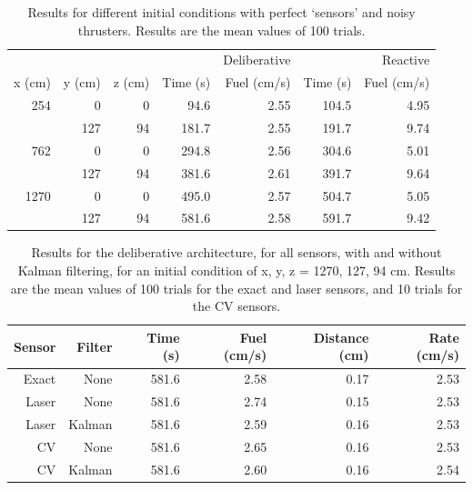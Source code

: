 \documentclass[journal, 10pt]{IEEEtran}
\begin{document}
\begin{table}
\centering
\normalsize
\caption{\label{mean}Results for different initial conditions with perfect `sensors' and noisy thrusters. Results are the mean values of 100 trials.}
\begin{tabular}{r r r | r r | r r}
\toprule
     &     &    &          & Deliberative &           & Reactive \\
   x (cm)& y (cm)& z (cm)& Time (s) & Fuel (cm/s) &  Time (s) & Fuel (cm/s) \\
\midrule
254  & 0   & 0  &  94.6 & 2.55 & 104.5 & 4.95 \\
     & 127 & 94 & 181.7 & 2.55 & 191.7 & 9.74 \\
762  & 0   & 0  & 294.8 & 2.56 & 304.6 & 5.01 \\
     & 127 & 94 & 381.6 & 2.61 & 391.7 & 9.64 \\
1270 & 0   & 0  & 495.0 & 2.57 & 504.7 & 5.05 \\
     & 127 & 94 & 581.6 & 2.58 & 591.7 & 9.42 \\
\bottomrule
\end{tabular}
\end{table}

\begin{table}
\centering
\normalsize
\caption{\label{delib_comparisons}Results for the deliberative architecture, for all sensors, with and without Kalman filtering, for an initial condition of x, y, z = 1270, 127, 94 cm. Results are the mean values of 100 trials for the exact and laser sensors, and 10 trials for the CV sensors.}
\begin{tabular}{r r | r r r r }
\toprule
Sensor & Filter & Time (s) & Fuel (cm/s) & Distance (cm) & Rate (cm/s)   \\
\midrule
 Exact &   None &    581.6 &        2.58 &          0.17 &        2.53   \\
 Laser &   None &    581.6 &        2.74 &          0.15 &        2.53   \\
 Laser & Kalman &    581.6 &        2.59 &          0.16 &        2.53   \\
    CV &   None &    581.6 &        2.65 &          0.16 &        2.53   \\
    CV & Kalman &    581.6 &        2.60 &          0.16 &        2.54   \\
\bottomrule
\end{tabular}
\end{table}
\end{document}
